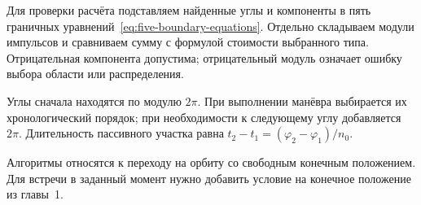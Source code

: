 Для проверки расчёта подставляем найденные углы и компоненты
в пять граничных уравнений~\eqref{eq:five-boundary-equations}.
Отдельно складываем модули импульсов и сравниваем сумму с формулой
стоимости выбранного типа. Отрицательная компонента допустима;
отрицательный модуль означает ошибку выбора области или распределения.

Углы сначала находятся по модулю $2\pi$.
При выполнении манёвра выбирается их хронологический порядок;
при необходимости к следующему углу добавляется $2\pi$.
Длительность пассивного участка равна
$t_2-t_1=(\varphi_2-\varphi_1)/n_0$.

Алгоритмы относятся к переходу на орбиту со свободным конечным
положением. Для встречи в заданный момент нужно добавить
условие на конечное положение из главы~1.

